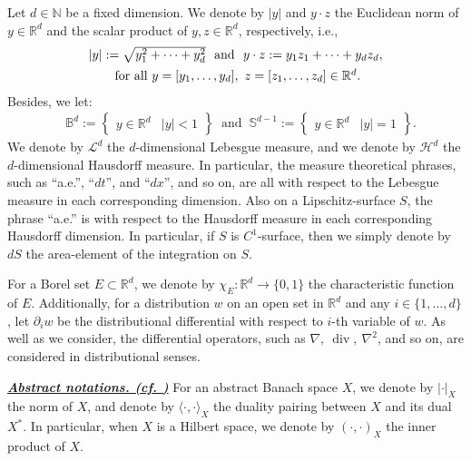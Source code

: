 \documentclass{sinst}
\numberwithin{equation}{section}
\theoremstyle{plain}
\theoremstyle{definition}
\def\N{\mathbb{N}}
\def\R{\mathbb{R}}
\DeclareMathOperator{\diver}{div}
\begin{document}
Let $ d \in \N $ be a fixed dimension. We denote by $ |y| $ and $ y \cdot z $ the Euclidean norm of $ y \in \mathbb{R}^d $ and the scalar product of $ y, z \in \R^d $, respectively, i.e., 
\begin{equation*}
\begin{array}{c}
| y | := \sqrt{y_1^2 +\cdots +y_d^2} \mbox{ \ and \ } y \cdot z  := y_1 z_1 +\cdots +y_d z_d, 
\\[1ex]
\mbox{ for all $ y = [y_1, \ldots, y_d], ~ z = [z_1, \ldots, z_d] \in \mathbb{R}^d $.}
\end{array}
\end{equation*}
Besides, we let:
\begin{align*}
    & \mathbb{B}^d := \left\{ \begin{array}{l|l}
        y \in \R^d & |y| < 1
    \end{array} \right\} ~ \mbox{ and } ~ \mathbb{S}^{d -1} := \left\{ \begin{array}{l|l}
        y \in \R^d & |y| = 1
    \end{array} \right\}.
\end{align*}
We denote by $\mathcal{L}^{d}$ the $ d $-dimensional Lebesgue measure, and we denote by $ \mathcal{H}^{d} $ the $ d $-dimensional Hausdorff measure.  In particular, the measure theoretical phrases, such as ``a.e.'', ``$dt$'', and ``$dx$'', and so on, are all with respect to the Lebesgue measure in each corresponding dimension. Also on a Lipschitz-surface $ S $, the phrase ``a.e.'' is with respect to the Hausdorff measure in each corresponding Hausdorff dimension. In particular, if $S$ is $C^1$-surface, then we simply denote by $dS$ the area-element of the integration on $S$.

For a Borel set $ E \subset \R^d $, we denote by $ \chi_E : \R^d \longrightarrow \{0, 1\} $ the characteristic function of $ E $. Additionally, for a distribution $ w $ on an open set in $ \R^d $ and any $i \in \{ 1,\dots,d \}$, let $ \partial_i w$ be the distributional differential with respect to $i$-th variable of $w$. As well as we consider, the differential operators, such as $\nabla,\ \diver, \ \nabla^2$, and so on, are considered in distributional senses.
\bigskip

\noindent
\underline{\textbf{\textit{Abstract notations. (cf. \cite[Chapter II]{MR0348562})}}}
For an abstract Banach space $ X $, we denote by $ |\cdot|_{X} $ the norm of $ X $, and denote by $ \langle \cdot, \cdot \rangle_X $ the duality pairing between $ X $ and its dual $ X^* $. In particular, when $ X $ is a Hilbert space, we denote by $ (\cdot,\cdot)_{X} $ the inner product of $ X $. 
\end{document}
